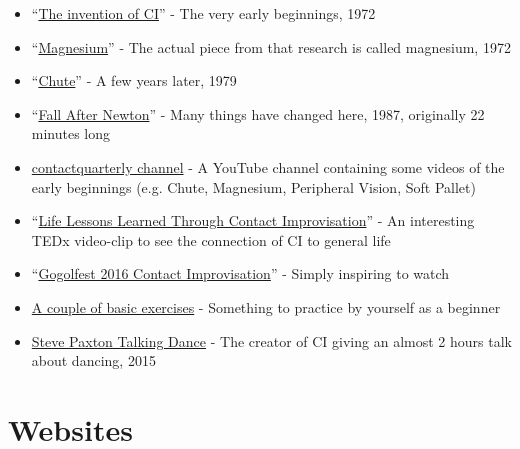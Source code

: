 \begin{itemize}
    \setlength\itemsep{0em}
    \item ``\href{https://www.youtube.com/watch?v=9FeSDsmIeHA}{The invention of CI}'' - The very early beginnings, 1972
    \item ``\href{https://www.youtube.com/watch?v=5gEfVJBhwrQ}{Magnesium}'' - The actual piece from that research is called magnesium, 1972
    \item ``\href{https://www.youtube.com/watch?v=xKlO-2e3gHo}{Chute}'' - A few years later, 1979
    \item ``\href{https://www.youtube.com/watch?v=k768K\_OTePM}{Fall After Newton}'' - Many things have changed here, 1987, originally 22 minutes long
    \item \href{https://www.youtube.com/@contactquarterly}{contactquarterly channel} - A YouTube channel containing some videos of the early beginnings (e.g. Chute, Magnesium, Peripheral Vision, Soft Pallet)
    \item ``\href{https://www.youtube.com/watch?v=hlIRjfto7o0}{Life Lessons Learned Through Contact Improvisation}'' - An interesting TEDx video-clip to see the connection of CI to general life
    \item ``\href{https://www.youtube.com/watch?v=n1D9RU2GbBo}{Gogolfest 2016 Contact Improvisation}'' - Simply inspiring to watch
    \item \href{https://www.youtube.com/watch?v=H8JiB2Nv5Qo}{A couple of basic exercises} - Something to practice by yourself as a beginner
    \item \href{https://www.youtube.com/watch?v=_82Od5NM4LI}{Steve Paxton Talking Dance} - The creator of CI giving an almost 2 hours talk about dancing, 2015
\end{itemize}

\section{Websites}\label{sec:websites}

